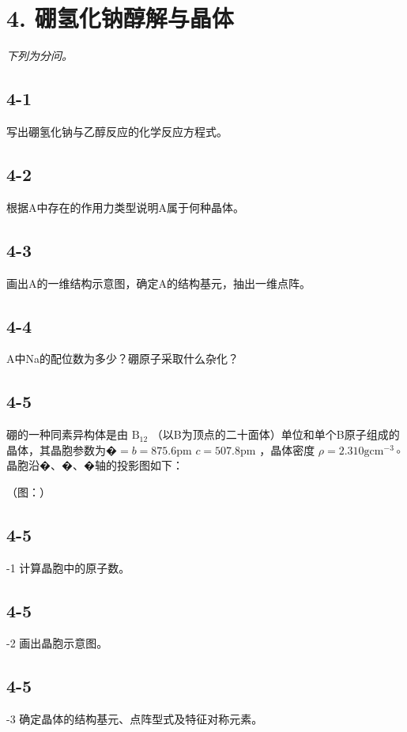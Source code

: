 \section*{4. 硼氢化钠醇解与晶体}
\textit{下列为分问。}

\subsection*{4-1}
写出硼氢化钠与⼄醇反应的化学反应⽅程式。

\subsection*{4-2}
根据A中存在的作⽤⼒类型说明A属于何种晶体。

\subsection*{4-3}
画出A的⼀维结构⽰意图，确定A的结构基元，抽出⼀维点阵。

\subsection*{4-4}
A中Na的配位数为多少？硼原⼦采取什么杂化？

\subsection*{4-5}
硼的⼀种同素异构体是由 $\mathrm { B } _ { 1 2 }$ （以B为顶点的⼆⼗⾯体）单位和单个B原⼦组成的晶体，其晶胞参数为�$= b = 8 7 5 . 6 \mathrm { p m }$ $c = 5 0 7 . 8 \mathrm { p m }$ ，晶体密度 $\rho = 2 . 3 1 0 \mathrm { g c m } ^ { - 3 } \circ$ 晶胞沿�、�、�轴的投影图如下：

（图：）

\subsection*{4-5}
-1 计算晶胞中的原⼦数。

\subsection*{4-5}
-2 画出晶胞⽰意图。

\subsection*{4-5}
-3 确定晶体的结构基元、点阵型式及特征对称元素。
